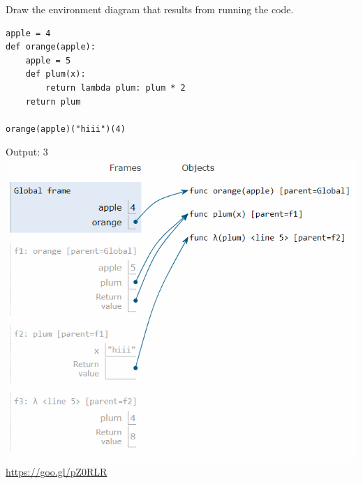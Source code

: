 \begin{blocksection}
\question Draw the environment diagram that results from running the code.

\begin{lstlisting}
apple = 4
def orange(apple):
    apple = 5
    def plum(x):
        return lambda plum: plum * 2
    return plum

orange(apple)("hiii")(4)
\end{lstlisting}

\begin{solution}[2in]
Output: 3 \newline
\includegraphics[scale=0.5]{apple.png}
\newline
\url{https://goo.gl/pZ0RLR}
\end{solution}
\end{blocksection}
